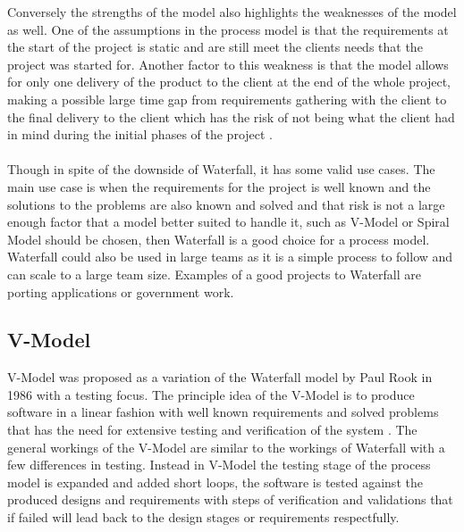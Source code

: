 \documentclass{style/CRPITStyle}
\renewcommand{\cite}{\citep}
\begin{document}
Conversely the strengths of the model also highlights the weaknesses of the model as
well.
One of the assumptions in the process model is that the requirements at the start of the project is
static and are still meet the clients needs that the project was started for.
Another factor to this weakness is that the model allows for only one delivery of the product to
the client at the end of the whole project, making a possible large time gap from requirements 
gathering with the client to the final delivery to the client which has the risk of not being 
what the client had in mind during the initial phases of the project
\cite{McCracken:1982}.

\paragraph{}
Though in spite of the downside of Waterfall, it has some valid use cases.
The main use case is when the requirements for the project is well known and the
solutions to the problems are also known and solved and that risk is not a large
enough factor that a model better suited to handle it, such as V-Model or Spiral
Model should be chosen, then Waterfall is a good choice for a process model.
Waterfall could also be used in large teams as it is a simple process to follow
and can scale to a large team size.
Examples of a good projects to Waterfall are porting applications or government
work.

\subsection{V-Model} %

V-Model was proposed as a variation of the Waterfall model by Paul Rook in 1986
\cite{rook:1986:vmodel} with a testing focus.
The principle idea of the V-Model is to produce software in a linear fashion with
well known requirements and solved problems that has the need for extensive testing 
and verification of the system \cite{rook:1986:vmodel}.
The general workings of the V-Model are similar to the workings of Waterfall
with a few differences in testing.
Instead in V-Model the testing stage of the process model is expanded and added short loops,
the software is tested against the produced designs and requirements with
steps of verification and validations  that if failed will lead back to the design
stages or requirements respectfully.
\end{document}
